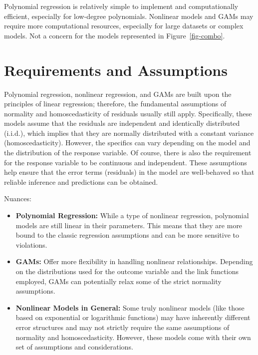 \documentclass[
  letterpaper,
]{book}
\providecommand{\tightlist}{%
  \setlength{\itemsep}{0pt}\setlength{\parskip}{0pt}}\usepackage{longtable,booktabs,array}
\begin{document}
Polynomial regression is relatively simple to implement and
computationally efficient, especially for low-degree polynomials.
Nonlinear models and GAMs may require more computational resources,
especially for large datasets or complex models. Not a concern for the
models represented in Figure~\ref{fig-combo}.

\section{Requirements and Assumptions}\label{sec-assumptions}

Polynomial regression, nonlinear regression, and GAMs are built upon the
principles of linear regression; therefore, the fundamental assumptions
of normality and homoscedasticity of residuals usually still apply.
Specifically, these models assume that the residuals are independent and
identically distributed (i.i.d.), which implies that they are normally
distributed with a constant variance (homoscedasticity). However, the
specifics can vary depending on the model and the distribution of the
response variable. Of course, there is also the requirement for the
response variable to be continuous and independent. These assumptions
help ensure that the error terms (residuals) in the model are
well-behaved so that reliable inference and predictions can be obtained.

Nuances:

\begin{itemize}
\tightlist
\item
  \textbf{Polynomial Regression:} While a type of nonlinear regression,
  polynomial models are still linear in their parameters. This means
  that they are more bound to the classic regression assumptions and can
  be more sensitive to violations.
\item
  \textbf{GAMs:} Offer more flexibility in handling nonlinear
  relationships. Depending on the distributions used for the outcome
  variable and the link functions employed, GAMs can potentially relax
  some of the strict normality assumptions.
\item
  \textbf{Nonlinear Models in General:} Some truly nonlinear models
  (like those based on exponential or logarithmic functions) may have
  inherently different error structures and may not strictly require the
  same assumptions of normality and homoscedasticity. However, these
  models come with their own set of assumptions and considerations.
\end{itemize}
\end{document}
